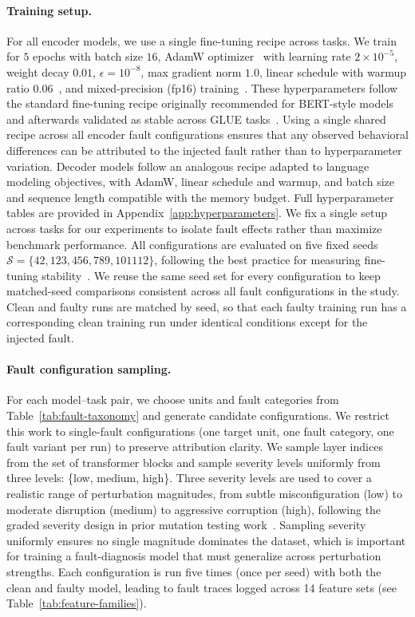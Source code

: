 \paragraph{Training setup.}
For all encoder models, we use a single fine-tuning recipe across tasks. We train for $5$ epochs with batch size $16$, AdamW optimizer~\citep{loshchilov2019adamw} with learning rate $2\times10^{-5}$, weight decay $0.01$, $\epsilon = 10^{-8}$, max gradient norm $1.0$, linear schedule with warmup ratio $0.06$~\citep{goyal2017warmup}, and mixed-precision (fp16) training~\citep{micikevicius2018mixed}. These hyperparameters follow the standard fine-tuning recipe originally recommended for BERT-style models~\citep{devlin2019bert} and afterwards validated as stable across GLUE tasks~\citep{mosbach2021stability}. Using a single shared recipe across all encoder fault configurations ensures that any observed behavioral differences can be attributed to the injected fault rather than to hyperparameter variation. Decoder models follow an analogous recipe adapted to language modeling objectives, with AdamW, linear schedule and warmup, and batch size and sequence length compatible with the memory budget. Full hyperparameter tables are provided in Appendix~\ref{app:hyperparameters}. We fix a single setup across tasks for our experiments to isolate fault effects rather than maximize benchmark performance. All configurations are evaluated on five fixed seeds $\mathcal{S} = \{42, 123, 456, 789, 101112\}$, following the best practice for measuring fine-tuning stability~\citep{mosbach2021stability}. We reuse the same seed set for every configuration to keep matched-seed comparisons consistent across all fault configurations in the study. Clean and faulty runs are matched by seed, so that each faulty training run has a corresponding clean training run under identical conditions except for the injected fault.

\paragraph{Fault configuration sampling.}
For each model--task pair, we choose units and fault categories from Table~\ref{tab:fault-taxonomy} and generate candidate configurations. We restrict this work to single-fault configurations (one target unit, one fault category, one fault variant per run) to preserve attribution clarity. We sample layer indices from the set of transformer blocks and sample severity levels uniformly from three levels: \{\textnormal{low}, \textnormal{medium}, \textnormal{high}\}. Three severity levels are used to cover a realistic range of perturbation magnitudes, from subtle misconfiguration (low) to moderate disruption (medium) to aggressive corruption (high), following the graded severity design in prior mutation testing work~\citep{deepcrime,deepmutation++}. Sampling severity uniformly ensures no single magnitude dominates the dataset, which is important for training a fault-diagnosis model that must generalize across perturbation strengths. Each configuration is run five times (once per seed) with both the clean and faulty model, leading to fault traces logged across 14 feature sets (see Table~\ref{tab:feature-families}).

